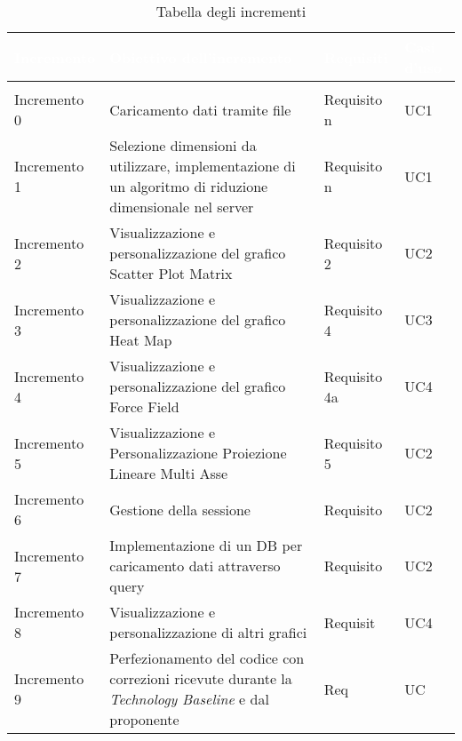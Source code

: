 \begin{longtable}{C{2cm} C{7cm} C{2cm} C{2cm}}
\textcolor{white}{\textbf{Incremento}} & 
\textcolor{white}{\textbf{Obiettivo dell'incremento}} & 
\textcolor{white}{\textbf{Requisiti}} &
\textcolor{white}{\textbf{Casi d'uso}}\\
\endfirsthead
{}\\
\endfoot
{}\caption{Tabella degli incrementi}
\endlastfoot

Incremento 0 & Caricamento dati tramite file & Requisito n & UC1\\
Incremento 1 & Selezione dimensioni da utilizzare, implementazione di un algoritmo di riduzione dimensionale nel server & Requisito n & UC1 \\
Incremento 2 & Visualizzazione e personalizzazione del grafico Scatter Plot Matrix & Requisito 2 & UC2\\
Incremento 3 & Visualizzazione e personalizzazione del grafico Heat Map & Requisito 4 & UC3\\
Incremento 4 & Visualizzazione e personalizzazione del grafico Force Field & Requisito 4a & UC4\\
Incremento 5 & Visualizzazione e Personalizzazione Proiezione Lineare Multi Asse & Requisito 5 & UC2\\
Incremento 6 & Gestione della sessione & Requisito & UC2\\
Incremento 7 & Implementazione di un DB per caricamento dati attraverso query & Requisito & UC2\\
Incremento 8 & Visualizzazione e personalizzazione di altri grafici & Requisit & UC4\\
Incremento 9 & Perfezionamento del codice con correzioni ricevute durante la \textit{Technology
Baseline} e dal proponente & Req & UC \\
\end{longtable}
